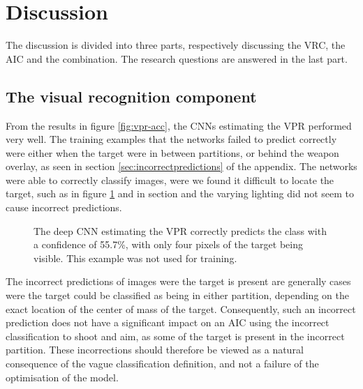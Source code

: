 
\section{Discussion}
\label{sec:discussion}
The discussion is divided into three parts, respectively discussing the VRC, the AIC and the combination. The research questions are answered in the last part.

\subsection{The visual recognition component}
From the results in figure \ref{fig:vpr-acc}, the CNNs estimating the VPR performed very well. The training examples that the networks failed to predict correctly were either when the target were in between partitions, or behind the weapon overlay, as seen in section \ref{sec:incorrectpredictions} of the appendix. The networks were able to correctly classify images, were we found it difficult to locate the target, such as in figure \ref{fig:hardprediction} and in section  and the varying lighting did not seem to cause incorrect predictions.

\begin{figure}[H]
	\begin{scriptsize}
		\sffamily
		\def\svgwidth{\textwidth}
		
	\end{scriptsize}
	\caption[Difficult VPR classification example]{The deep CNN estimating the VPR correctly predicts the class with a confidence of 55.7\%, with only four pixels of the target being visible. This example was not used for training.}
	\label{fig:hardprediction}
\end{figure}

The incorrect predictions of images were the target is present are generally cases were the target could be classified as being in either partition, depending on the exact location of the center of mass of the target. Consequently, such an incorrect prediction does not have a significant impact on an AIC using the incorrect classification to shoot and aim, as some of the target is present in the incorrect partition. These incorrections should therefore be viewed as a natural consequence of the vague classification definition, and not a failure of the optimisation of the model.

